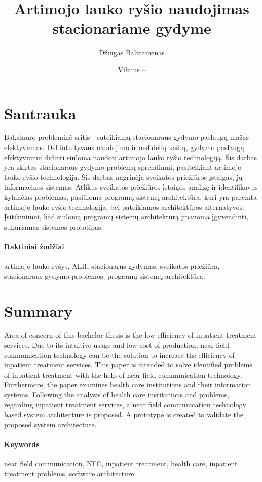 \documentclass{VUMIFPSbakalaurinis}
\title{Artimojo lauko ryšio naudojimas stacionariame gydyme}
\author{Džiugas Baltramėnas}
\date{Vilnius – \the\year}
\begin{document}
\newpage


\maketitle


\section*{Santrauka}
Bakalauro probleminė sritis - suteikiamų stacionaraus gydymo paslaugų mažas efektyvumas. Dėl intuityvaus naudojimo ir nedidelių kaštų, gydymo paslaugų efektyvumui didinti siūloma naudoti artimojo lauko ryšio technologiją. Šis darbas yra skirtas stacionaraus gydymo problemų sprendimui, pasitelkiant artimojo lauko ryšio technologiją. Šis darbas nagrinėja sveikatos priežiūros įstaigas, jų informacines sistemas. Atlikus sveikatos priežiūros įstaigos analizę ir identifikavus kylančias problemas, pasiūloma programų sistemų architektūra, kuri yra paremta artimojo lauko ryšio technologija, bei pateikiamos architektūros alternatyvos. Įsitikinimui, kad siūlomą programų sistemų architektūrą įmanoma įgyvendinti, sukuriamas sistemos prototipas.


\paragraph*{Raktiniai žodžiai}artimojo lauko ryšys, ALR, stacionarus gydymas, sveikatos priežiūra, stacionaraus gydymo problemos, programų sistemų architektūra.



\section*{Summary}
Area of concern of this bachelor thesis is the low efficiency of inpatient treatment services.
Due to its intuitive usage and low cost of production, near field communication technology can be
the solution to increase the efficiency of inpatient treatment services. This paper is intended to solve
identified problems of inpatient treatment with the help of near field communication technology.
Furthermore, the paper examines health care institutions and their information systems. Following
the analysis of health care institutions and problems, regarding inpatient treatment services, a near
field communication technology based system architecture is proposed. A prototype is created to
validate the proposed system architecture.
\paragraph{Keywords}near field communication, NFC, inpatient treatment, health care, inpatient treatment problems, software architecture.
\end{document}
